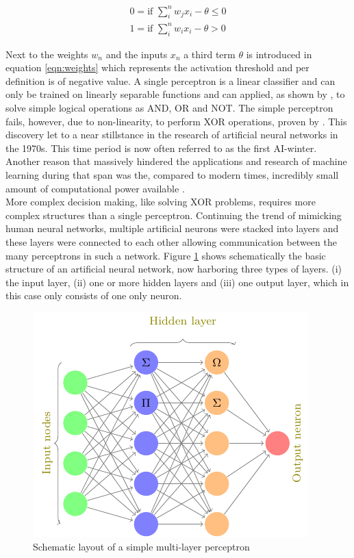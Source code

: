 \begin{subequations}
 \begin{align}
   0 = \mbox{if } \sum_i^n w_j x_i - \theta \leq 0 \\
   1 = \mbox{if } \sum_i^n w_i x_i - \theta > 0
 \end{align}
 \label{eqn:weights}
\end{subequations}

\noindent
Next to the weights $w_n$ and the inputs $x_n$ a third term $\theta$ is introduced in equation
\ref{eqn:weights} which represents the activation threshold and per definition is of negative value. A single
perceptron is a linear classifier and can only be trained on linearly separable functions and can applied, as
shown by \cite{rosenblatt1961}, to solve simple logical operations as AND, OR and NOT. The simple perceptron
fails, however, due to non-linearity, to perform XOR operations, proven by \cite{marvin1969}. This discovery
let to a near stillstance in the research of artificial neural networks in the 1970s. This time period is now
often referred to as the first AI-winter. Another reason that massively hindered the applications and research
of machine learning during that span was the, compared to
modern times, incredibly small amount of computational power available \cite{nguyen1990truck}. \\
More complex decision making, like solving XOR problems, requires more complex structures than a single
perceptron. Continuing the trend of mimicking human neural networks, multiple artificial neurons were stacked
into layers and these layers were connected to each other allowing communication between the many perceptrons
in such a network. Figure \ref{fig:nn} shows schematically the basic structure of an artificial neural network,
now harboring three types of layers. (i) the input layer, (ii) one or more hidden layers and (iii) one output
layer, which in this case only consists of one only neuron.

\begin{figure}[H]
\centering
\includegraphics[height=.25\textheight, width=.5\textwidth]{Figures/neuralnet}
\decoRule
\caption[Schematic layout of a simple multi-layer perceptron]{Schematic layout of a simple multi-layer perceptron}
\label{fig:nn}
\end{figure}

